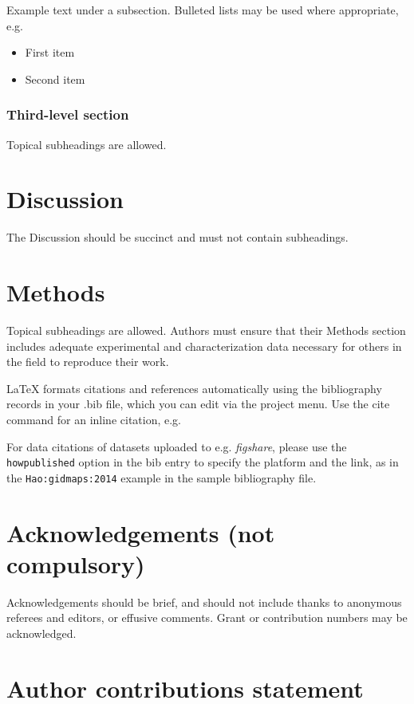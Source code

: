 \documentclass[fleqn,10pt]{wlscirep}
\begin{document}
Example text under a subsection. Bulleted lists may be used where appropriate, e.g.

\begin{itemize}
\item First item
\item Second item
\end{itemize}

\subsubsection*{Third-level section}
 
Topical subheadings are allowed.

\section*{Discussion}

The Discussion should be succinct and must not contain subheadings.

\section*{Methods}

Topical subheadings are allowed. Authors must ensure that their Methods section includes adequate experimental and characterization data necessary for others in the field to reproduce their work.



\noindent LaTeX formats citations and references automatically using the bibliography records in your .bib file, which you can edit via the project menu. Use the cite command for an inline citation, e.g. 

For data citations of datasets uploaded to e.g. \emph{figshare}, please use the \verb|howpublished| option in the bib entry to specify the platform and the link, as in the \verb|Hao:gidmaps:2014| example in the sample bibliography file.

\section*{Acknowledgements (not compulsory)}

Acknowledgements should be brief, and should not include thanks to anonymous referees and editors, or effusive comments. Grant or contribution numbers may be acknowledged.

\section*{Author contributions statement}
\end{document}
